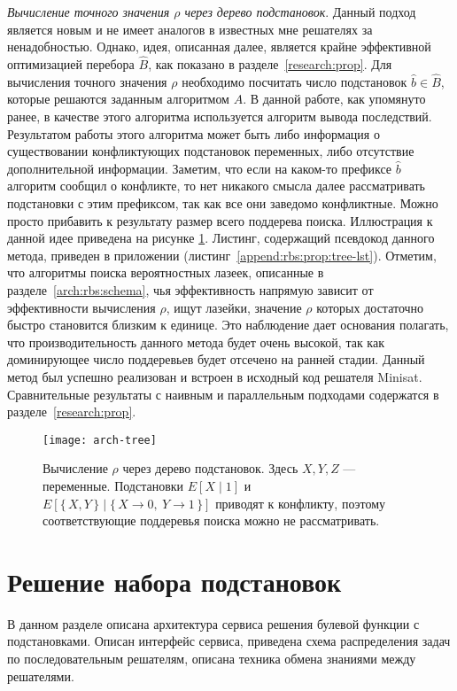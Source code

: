 \textit{Вычисление точного значения $\rho$ через дерево подстановок}\label{arch:rbs:prop:tree}.
Данный подход является новым и не имеет аналогов в известных мне решателях за ненадобностью. Однако,
идея, описанная далее, является крайне эффективной оптимизацией перебора $\hat{B}$, как показано в
разделе~\ref{research:prop}. Для вычисления точного значения $\rho$ необходимо посчитать число
подстановок $\hat{b} \in \hat{B}$, которые решаются заданным алгоритмом $A$. В данной работе, как
упомянуто ранее, в качестве этого алгоритма используется алгоритм вывода последствий. Результатом
работы этого алгоритма может быть либо информация о существовании конфликтующих подстановок переменных,
либо отсутствие дополнительной информации. Заметим, что если на каком-то префиксе $\hat{b}$ 
алгоритм сообщил о конфликте, то нет никакого смысла далее рассматривать подстановки с этим префиксом,
так как все они заведомо конфликтные. Можно просто прибавить к результату размер всего поддерева поиска.
Иллюстрация к данной идее приведена на рисунке \ref{arch:rbs:prop:tree-img}. Листинг, содержащий
псевдокод данного метода, приведен в приложении (листинг~\ref{append:rbs:prop:tree-lst}).
Отметим, что алгоритмы поиска вероятностных лазеек, описанные в разделе~\ref{arch:rbs:schema},
чья эффективность напрямую зависит от эффективности вычисления $\rho$, ищут лазейки, значение
$\rho$ которых достаточно быстро становится близким к единице. Это наблюдение дает основания
полагать, что производительность данного метода будет очень высокой, так как доминирующее
число поддеревьев будет отсечено на ранней стадии. Данный метод был успешно реализован и встроен 
в исходный код решателя Minisat. Сравнительные результаты с наивным и параллельным подходами 
содержатся в разделе~\ref{research:prop}.

\begin{figure}[H]
    \caption{Вычисление $\rho$ через дерево подстановок. Здесь $X,Y,Z$ --- переменные. Подстановки
    $E[X \mid 1]$ и $E[\{\,X,Y\,\} \mid \{\, X \to 0,~ Y \to 1 \,\}]$ приводят к конфликту, поэтому
    соответствующие поддеревья поиска можно не рассматривать.}
    \centering
    \texttt{[image: arch-tree]}
    \label{arch:rbs:prop:tree-img}
\end{figure}

\section{Решение набора подстановок}\label{arch:solver}

В данном разделе описана архитектура сервиса решения булевой функции с подстановками. Описан интерфейс
сервиса, приведена схема распределения задач по последовательным решателям, описана техника обмена
знаниями между решателями.

